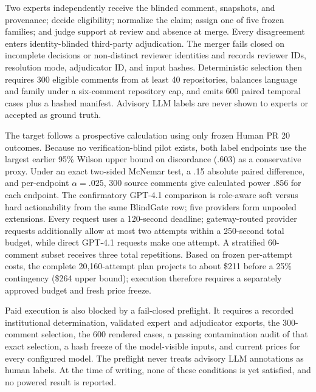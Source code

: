 \documentclass[acmsmall,screen,review,anonymous]{acmart}
\begin{document}
Two experts independently receive the blinded comment, snapshots, and provenance; decide eligibility; normalize the claim; assign one of five frozen families; and judge support at review and absence at merge. Every disagreement enters identity-blinded third-party adjudication. The merger fails closed on incomplete decisions or non-distinct reviewer identities and records reviewer IDs, resolution mode, adjudicator ID, and input hashes. Deterministic selection then requires 300 eligible comments from at least 40 repositories, balances language and family under a six-comment repository cap, and emits 600 paired temporal cases plus a hashed manifest. Advisory LLM labels are never shown to experts or accepted as ground truth.

The target follows a prospective calculation using only frozen Human PR 20 outcomes. Because no verification-blind pilot exists, both label endpoints use the largest earlier 95\% Wilson upper bound on discordance (.603) as a conservative proxy. Under an exact two-sided McNemar test, a .15 absolute paired difference, and per-endpoint $\alpha=.025$, 300 source comments give calculated power .856 for each endpoint. The confirmatory GPT-4.1 comparison is role-aware soft versus hard actionability from the same BlindGate row; five providers form unpooled extensions. Every request uses a 120-second deadline; gateway-routed provider requests additionally allow at most two attempts within a 250-second total budget, while direct GPT-4.1 requests make one attempt. A stratified 60-comment subset receives three total repetitions. Based on frozen per-attempt costs, the complete 20,160-attempt plan projects to about \$211 before a 25\% contingency (\$264 upper bound); execution therefore requires a separately approved budget and fresh price freeze.

Paid execution is also blocked by a fail-closed preflight. It requires a recorded institutional determination, validated expert and adjudicator exports, the 300-comment selection, the 600 rendered cases, a passing contamination audit of that exact selection, a hash freeze of the model-visible inputs, and current prices for every configured model. The preflight never treats advisory LLM annotations as human labels. At the time of writing, none of these conditions is yet satisfied, and no powered result is reported.
\end{document}
